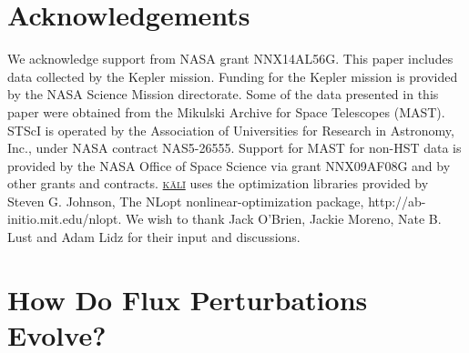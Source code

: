 \documentclass[a4paper,fleqn,usenatbib]{mnras}
\begin{document}
\section*{Acknowledgements}

We acknowledge support from NASA grant NNX14AL56G. This paper includes data collected by the Kepler mission. Funding for the Kepler mission is provided by the NASA Science Mission directorate. Some of the data presented in this paper were obtained from the Mikulski Archive for Space Telescopes (MAST). STScI is operated by the Association of Universities for Research in Astronomy, Inc., under NASA contract NAS5-26555. Support for MAST for non-HST data is provided by the NASA Office of Space Science via grant NNX09AF08G and by other grants and contracts. \href{https://github.com/AstroVPK/kali}{\textsc{k\={a}l\={i}}} uses the optimization libraries provided by Steven G. Johnson, The NLopt nonlinear-optimization package, http://ab-initio.mit.edu/nlopt. We wish to thank Jack O'Brien, Jackie Moreno, Nate B. Lust and Adam Lidz for their input and discussions.











\appendix

\section[Perturbation Evolution]{How Do Flux Perturbations Evolve?}\label{sec:LHS}
\end{document}
